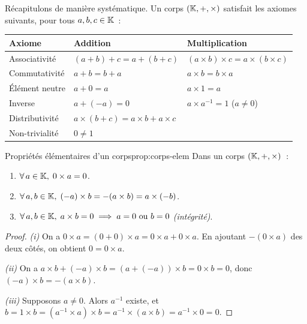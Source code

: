 Récapitulons de manière systématique. Un corps $({\mathbb{K}},+,\times)$ satisfait
les axiomes suivants, pour tous $a,b,c\in{\mathbb{K}}$~:

\bigskip
\begin{center}
\renewcommand{\arraystretch}{1.4}
\begin{tabular}{@{}lll@{}}
\toprule
\textbf{Axiome} & \textbf{Addition} & \textbf{Multiplication} \\
\midrule
Associativité   & $(a+b)+c=a+(b+c)$  & $(a\times b)\times c = a\times(b\times c)$ \\
Commutativité   & $a+b=b+a$          & $a\times b = b\times a$ \\
Élément neutre  & $a+0=a$            & $a\times 1=a$ \\
Inverse         & $a+(-a)=0$         & $a\times a^{-1}=1$ \; ($a\neq 0$) \\
Distributivité  & \multicolumn{2}{l}{$a\times(b+c)=a\times b + a\times c$} \\
Non-trivialité  & \multicolumn{2}{l}{$0\neq 1$} \\
\bottomrule
\end{tabular}
\end{center}

\begin{proposition}{Propriétés élémentaires d'un corps}{prop:corps-elem}
  Dans un corps $({\mathbb{K}},+,\times)$~:
  \begin{enumerate}[label=(\roman*)]
    \item $\forall\, a\in{\mathbb{K}},\; 0\times a = 0$.
    \item $\forall\, a,b\in{\mathbb{K}},\; (-a)\times b = -(a\times b) = a\times(-b)$.
    \item $\forall\, a,b\in{\mathbb{K}},\; a\times b = 0 \implies a=0\text{ ou }b=0$
      \emph{(intégrité)}.
  \end{enumerate}
\end{proposition}

\begin{proof}
  \emph{(i)} On a $0\times a = (0+0)\times a = 0\times a + 0\times a$.
  En ajoutant $-(0\times a)$ des deux côtés, on obtient $0=0\times a$.

  \emph{(ii)} On a $a\times b + (-a)\times b = (a+(-a))\times b = 0\times b = 0$,
  donc $(-a)\times b = -(a\times b)$.

  \emph{(iii)} Supposons $a\neq 0$. Alors $a^{-1}$ existe, et
  $b = 1\times b = (a^{-1}\times a)\times b = a^{-1}\times(a\times b) =
  a^{-1}\times 0 = 0$.
\end{proof}

